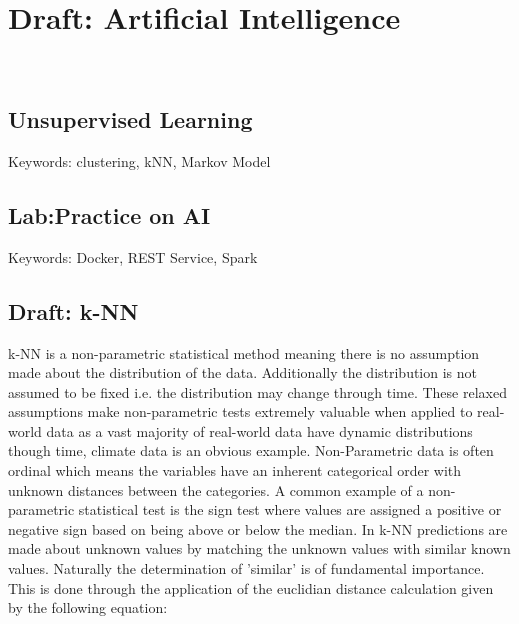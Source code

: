 \chapter{Draft: Artificial Intelligence}
\label{c:ai}

\FILENAME\

%
%

\section{Unsupervised Learning}

Keywords: clustering, kNN, Markov Model




\section{Lab:Practice on AI}
Keywords: Docker, REST Service, Spark


\section{Draft: k-NN}

k-NN is a non-parametric statistical method meaning there is no
assumption made about the distribution of the data. Additionally the
distribution is not assumed to be fixed i.e. the distribution may
change through time. These relaxed assumptions make non-parametric
tests extremely valuable when applied to real-world data as a vast
majority of real-world data have dynamic distributions though
time, climate data is an obvious example. Non-Parametric data is often ordinal
which means the variables have an inherent categorical order with
unknown distances between the categories. A common example of a
non-parametric statistical test is the sign test where values are
assigned a positive or negative sign based on being above or below the
median. In k-NN predictions are made about unknown values by matching
the unknown values with similar known values. Naturally the
determination of 'similar' is of fundamental importance. This is done
through the application of the euclidian distance calculation given by
the following equation: 

